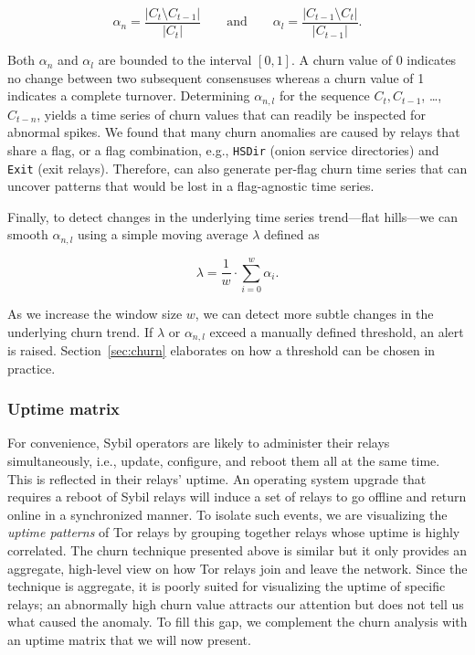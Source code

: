 \begin{equation}
\alpha_{n} = \frac{\lvert C_{t} \setminus C_{t-1} \rvert}
{\lvert C_{t} \rvert}
\qquad\text{and}\qquad
\alpha_{l} = \frac{\lvert C_{t-1} \setminus C_{t} \rvert}
{\lvert C_{t-1} \rvert}.
\end{equation}

Both $\alpha_{n}$ and $\alpha_{l}$ are bounded to the interval $[0, 1]$.  A
churn value of 0 indicates no change between two subsequent consensuses whereas
a churn value of 1 indicates a complete turnover.  Determining $\alpha_{n,l}$
for the sequence $C_{t}, C_{t-1}$, \ldots, $C_{t-n}$, yields a time series of
churn values that can readily be inspected for abnormal spikes.  We found that
many churn anomalies are caused by relays that share a flag, or a flag
combination, e.g., \texttt{HSDir} (onion service directories) and \texttt{Exit}
(exit relays).  Therefore, \sys can also generate per-flag churn time series
that can uncover patterns that would be lost in a flag-agnostic time series.

Finally, to detect changes in the underlying time series trend---flat hills---we
can smooth $\alpha_{n,l}$ using a simple moving average $\lambda$ defined as

\begin{equation}
\lambda = \frac{1}{w} \cdot \sum_{i=0}^{w} \alpha_{i}.
\end{equation}

As we increase the window size $w$, we can detect more subtle changes in the
underlying churn trend.  If $\lambda$ or $\alpha_{n,l}$ exceed a manually
defined threshold, an alert is raised.  Section~\ref{sec:churn} elaborates on
how a threshold can be chosen in practice.

\subsubsection{Uptime matrix}
\label{sec:uptime-matrix}
For convenience, Sybil operators are likely to administer their relays
simultaneously, i.e., update, configure, and reboot them all at the same time.
This is reflected in their relays' uptime.  An operating system upgrade that
requires a reboot of Sybil relays will induce a set of relays to go offline and
return online in a synchronized manner.  To isolate such events, we are
visualizing the \emph{uptime patterns} of Tor relays by grouping together relays
whose uptime is highly correlated.  The churn technique presented above is
similar but it only provides an aggregate, high-level view on how Tor relays
join and leave the network.  Since the technique is aggregate, it is poorly
suited for visualizing the uptime of specific relays; an abnormally high churn
value attracts our attention but does not tell us what caused the anomaly.  To
fill this gap, we complement the churn analysis with an uptime matrix that we
will now present.

